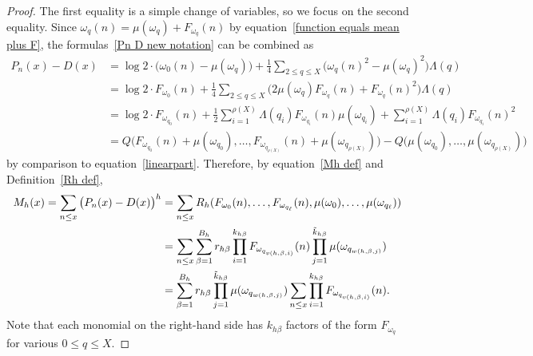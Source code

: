 \documentclass[12pt,reqno]{amsart}
\theoremstyle{definition}
\begin{document}
\begin{proof}
The first equality is a simple change of variables, so we focus on the second equality.
Since $\omega_q(n) = \mu(\omega_q) + F_{\omega_q}(n)$ by equation~\eqref{function equals mean plus F}, the formulas~\eqref{Pn D new notation} can be combined as
\begin{align*}
P_n(x) - D(x) &= \log 2 \cdot \big( \omega_0(n) - \mu(\omega_q) \big) + \frac14 \sum_{2\le q\le X} \big( \omega_{q}(n)^2 - \mu(\omega_q)^2 \big) \Lambda(q) \\
&= \log 2 \cdot F_{\omega_0}(n) + \frac14 \sum_{2\le q\le X} \big( 2\mu(\omega_q)F_{\omega_q}(n) + F_{\omega_q}(n)^2 \big) \Lambda(q) \\
&= \log 2 \cdot F_{\omega_{q_0}}(n) + \frac{1}{2} \sum_{i=1}^{\rho(X)} \Lambda({q_i}) F_{\omega_{q_i}}(n) \mu(\omega_{q_i}) + \sum_{i=1}^{\rho(X)} \Lambda({q_i}) F_{\omega_{q_i}}(n)^2 \\
&= Q\big( F_{\omega_{q_0}}(n)+\mu(\omega_{q_0}),\dots,F_{\omega_{q_{\rho(X)}}}(n)+\mu(\omega_{q_{\rho(X)}}) \big) - Q\big( \mu(\omega_{q_0}),\dots,\mu(\omega_{q_{\rho(X)}}) \big)
\end{align*}
by comparison to equation~\eqref{linearpart}.
Therefore, by equation~\eqref{Mh def} and Definition~\ref{Rh def},
\begin{align}
M_h(x) = \sum_{n \leq x} \big( P_n(x) - D(x) \big)^h &= \sum_{n \leq x} R_h(F_{\omega_0}(n), \ldots, F_{\omega_{q_\ell}}(n), \mu(\omega_0), \ldots, \mu(\omega_{q_\ell})) \notag \\
 &= \sum_{n \leq x} \sum_{\beta=1}^{B_h} r_{h\beta} \prod_{i=1}^{k_{h\beta}} F_{\omega_{q_{v(h,\beta, i)}}}(n) \prod_{j=1}^{\tilde k_{h\beta}} \mu(\omega_{q_{w(h,\beta, j)}}) \notag \\
 &= \sum_{\beta=1}^{B_h} r_{h\beta} \prod_{j=1}^{\tilde k_{h\beta}} \mu(\omega_{q_{w(h,\beta, j)}}) \sum_{n \leq x} \prod_{i=1}^{k_{h\beta}} F_{\omega_{q_{v(h,\beta, i)}}}(n). \label{grislyexpansion}
\end{align}
Note that each monomial on the right-hand side has $k_{h\beta}$ factors of the form $F_{\omega_q}$ for various $0\le q\le X$.


\end{proof}
\end{document}
